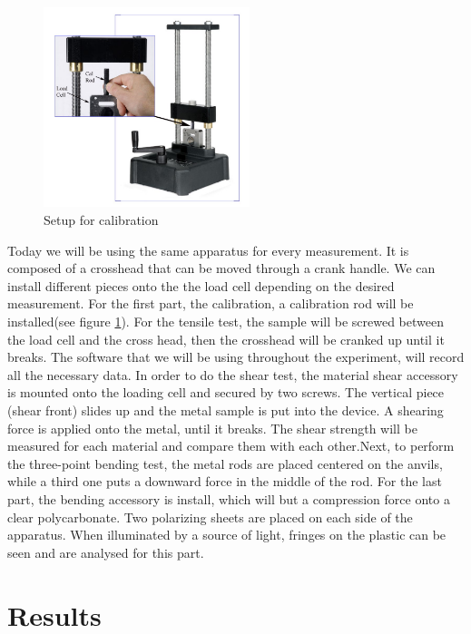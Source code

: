 \documentclass{scrartcl}
\begin{document}
\begin{figure}
    \centering
    \includegraphics[width=6cm]{Theory and Setup/Screenshot 2022-04-03 104556.png}
    \caption{Setup for calibration}
    \label{fig:cal}
\end{figure}
Today we will be using the same apparatus for every measurement. It is composed of a crosshead that can be moved through a crank handle. We can install different pieces onto the the load cell depending on the desired measurement. For the first part, the calibration, a calibration rod will be installed(see figure \ref{fig:cal}). For the tensile test, the sample will be screwed between the load cell and the cross head, then the crosshead will be cranked up until it breaks. The software that we will be using throughout the experiment, will record all the necessary data. In order to do the shear test, the material shear accessory is mounted onto the loading cell and secured by two screws. The vertical piece (shear front) slides up and the metal sample is put into the device. A shearing force is applied onto the metal, until it breaks. The shear strength will be measured for each material and compare them with each other.Next, to perform the three-point bending test, the metal rods are placed centered on the anvils, while a third one puts a downward force in the middle of the rod. For the last part, the bending accessory is install, which will but a compression force onto a clear polycarbonate. Two polarizing sheets are placed on each side of the apparatus. When illuminated by a source of light, fringes on the plastic can be seen and are analysed for this part.

\section{Results}
\end{document}

